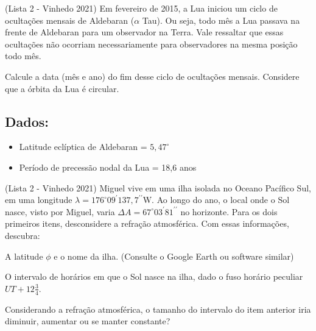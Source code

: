\documentclass[11pt]{article}
\begin{document}
\begin{pproblem} (Lista 2 - Vinhedo 2021)
    Em fevereiro de 2015, a Lua iniciou um ciclo de ocultações mensais de Aldebaran ($\alpha$ Tau). Ou seja, todo mês a Lua passava na frente de Aldebaran para um observador na Terra. Vale ressaltar que essas ocultações não ocorriam necessariamente para observadores na mesma posição todo mês. 

    Calcule a data (mês e ano) do fim desse ciclo de ocultações mensais. Considere que a órbita da Lua é circular.

    \subsection*{Dados:}

    \begin{itemize}
        \item Latitude eclíptica de Aldebaran = $5,47^\circ$
        \item Período de precessão nodal da Lua = 18,6 anos
    \end{itemize}
\end{pproblem}


\begin{pproblem} (Lista 2 - Vinhedo 2021)
    Miguel vive em uma ilha isolada no Oceano Pacífico Sul, em uma longitude
    $\lambda = 176^{\circ}09^{\prime}137,7^{\prime\prime}\text{W}$. Ao longo do ano, o local onde o Sol nasce, visto por Miguel, varia $\Delta A = 67^{\circ}03^{\prime}81^{\prime\prime}$ no horizonte. Para os dois primeiros itens, desconsidere a refração atmosférica. Com essas informações, descubra:

    \begin{alternativas}
        \item A latitude $\phi$ e o nome da ilha. (Consulte o Google Earth ou software similar)
        \item O intervalo de horários em que o Sol nasce na ilha, dado o fuso horário peculiar $UT + 12\frac{3}{4}$.
        \item Considerando a refração atmosférica, o tamanho do intervalo do item anterior iria diminuir, aumentar ou se manter constante?
    \end{alternativas}

\end{pproblem}
\end{document}
